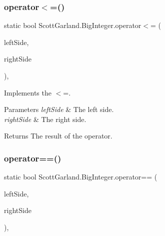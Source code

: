 \subsubsection{\texorpdfstring{operator$<$=()}{operator<=()}}
{\footnotesize\ttfamily static bool Scott\+Garland.\+Big\+Integer.\+operator$<$= (\begin{DoxyParamCaption}\item[{\hyperlink{class_scott_garland_1_1_big_integer}{Big\+Integer}}]{left\+Side,  }\item[{\hyperlink{class_scott_garland_1_1_big_integer}{Big\+Integer}}]{right\+Side }\end{DoxyParamCaption})\hspace{0.3cm}{\ttfamily [inline]}, {\ttfamily [static]}}



Implements the $<$=. 


\begin{DoxyParams}{Parameters}
{\em left\+Side} & The left side.\\
\hline
{\em right\+Side} & The right side.\\
\hline
\end{DoxyParams}
\begin{DoxyReturn}{Returns}
The result of the operator.
\end{DoxyReturn}
\mbox{\label{class_scott_garland_1_1_big_integer_a55ec557dd4fe3895e28f8e02473ad5c9}} 
\subsubsection{\texorpdfstring{operator==()}{operator==()}}
{\footnotesize\ttfamily static bool Scott\+Garland.\+Big\+Integer.\+operator== (\begin{DoxyParamCaption}\item[{\hyperlink{class_scott_garland_1_1_big_integer}{Big\+Integer}}]{left\+Side,  }\item[{\hyperlink{class_scott_garland_1_1_big_integer}{Big\+Integer}}]{right\+Side }\end{DoxyParamCaption})\hspace{0.3cm}{\ttfamily [inline]}, {\ttfamily [static]}}




